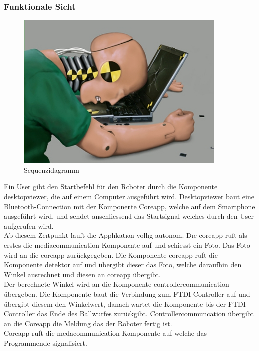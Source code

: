	\subsubsection{Funktionale Sicht}
	
	\begin{figure}[h!]
		\centering
		\includegraphics[width=0.9\textwidth]{Enddokumentation/CrashTestDummy.jpg}
		\caption{Sequenzidagramm}		
	\end{figure}
Ein User gibt den Startbefehl für den Roboter durch die Komponente desktopviewer, die auf einem Computer ausgeführt wird. Desktopviewer baut eine Bluetooth-Connection mit der Komponente Coreapp, welche auf dem Smartphone ausgeführt wird, und sendet anschliessend das Startsignal welches durch den User aufgerufen wird. \\
Ab diesem Zeitpunkt läuft die Applikation völlig autonom. Die coreapp ruft als erstes die mediacommunication Komponente auf und schiesst ein Foto. Das Foto wird an die coreapp zurückgegeben.
Die Komponente coreapp ruft die Komponente 	detektor auf und übergibt dieser das Foto, welche daraufhin den Winkel ausrechnet und diesen an coreapp übergibt.\\
Der berechnete Winkel wird an die Komponente controllercommunication übergeben. Die Komponente baut die Verbindung zum FTDI-Controller auf und übergibt diesem den Winkelwert, danach wartet die Komponente bis der FTDI-Controller das Ende des Ballwurfes zurückgibt. Controllercommuncation übergibt an die Coreapp die Meldung das der Roboter fertig ist. \\
Coreapp ruft die medacommunication Komponente auf welche das Programmende signalisiert.
		
		
